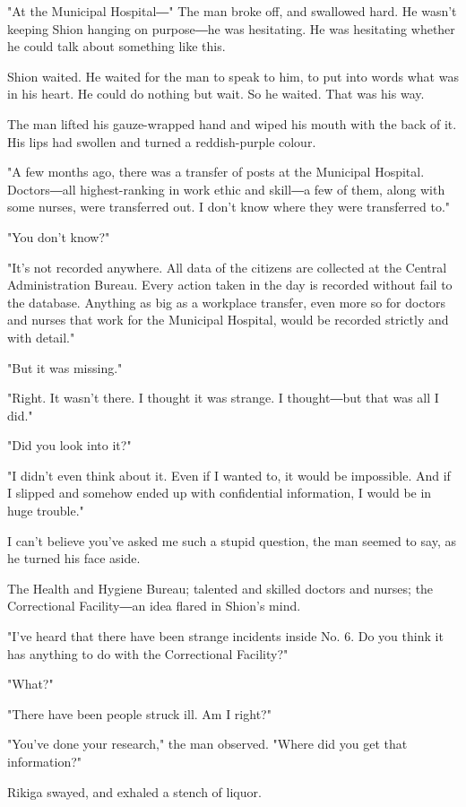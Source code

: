 "At the Municipal Hospital―" The man broke off, and swallowed hard. He
wasn't keeping Shion hanging on purpose―he was hesitating. He was
hesitating whether he could talk about something like this.

Shion waited. He waited for the man to speak to him, to put into words
what was in his heart. He could do nothing but wait. So he waited. That
was his way.

The man lifted his gauze-wrapped hand and wiped his mouth with the back
of it. His lips had swollen and turned a reddish-purple colour.

"A few months ago, there was a transfer of posts at the Municipal
Hospital. Doctors―all highest-ranking in work ethic and skill―a few of
them, along with some nurses, were transferred out. I don't know where
they were transferred to."

"You don't know?"

"It's not recorded anywhere. All data of the citizens are collected at
the Central Administration Bureau. Every action taken in the day is
recorded without fail to the database. Anything as big as a workplace
transfer, even more so for doctors and nurses that work for the
Municipal Hospital, would be recorded strictly and with detail."

"But it was missing."

"Right. It wasn't there. I thought it was strange. I thought―but that
was all I did."

"Did you look into it?"

"I didn't even think about it. Even if I wanted to, it would be
impossible. And if I slipped and somehow ended up with confidential
information, I would be in huge trouble."

I can't believe you've asked me such a stupid question, the man seemed
to say, as he turned his face aside.

The Health and Hygiene Bureau; talented and skilled doctors and nurses;
the Correctional Facility―an idea flared in Shion's mind.

"I've heard that there have been strange incidents inside No. 6. Do you
think it has anything to do with the Correctional Facility?"

"What?"

"There have been people struck ill. Am I right?"

"You've done your research," the man observed. "Where did you get that
information?"

Rikiga swayed, and exhaled a stench of liquor.

